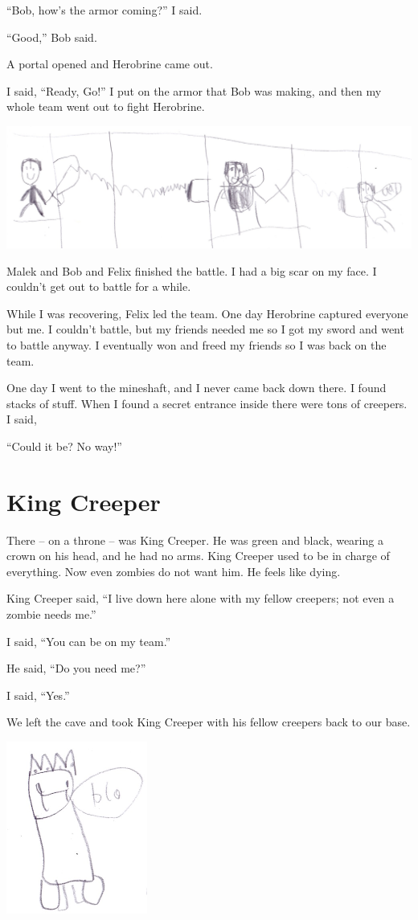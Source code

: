 \documentclass[oneside]{book}
\begin{document}
``Bob, how's the armor coming?'' I said.

``Good,'' Bob said.

A portal opened and Herobrine came out.

I said, ``Ready, Go!'' I put on the armor that Bob was making, and then
my whole team went out to fight Herobrine.

\includegraphics[width=6.25000in]{img/bob.jpg}

Malek and Bob and Felix finished the battle. I had a big scar on my
face. I couldn't get out to battle for a while.

While I was recovering, Felix led the team. One day Herobrine captured
everyone but me. I couldn't battle, but my friends needed me so I got my
sword and went to battle anyway. I eventually won and freed my friends
so I was back on the team.

One day I went to the mineshaft, and I never came back down there. I
found stacks of stuff. When I found a secret entrance inside there were
tons of creepers. I said,

``Could it be? No way!''

\chapter{King Creeper}\label{king-creeper}

There -- on a throne -- was King Creeper. He was green and black,
wearing a crown on his head, and he had no arms. King Creeper used to be
in charge of everything. Now even zombies do not want him. He feels like
dying.

King Creeper said, ``I live down here alone with my fellow creepers; not
even a zombie needs me.''

I said, ``You can be on my team.''

He said, ``Do you need me?''

I said, ``Yes.''

We left the cave and took King Creeper with his fellow creepers back to
our base.

\includegraphics[width=1.82292in]{img/king-creeper.jpg}
\end{document}
